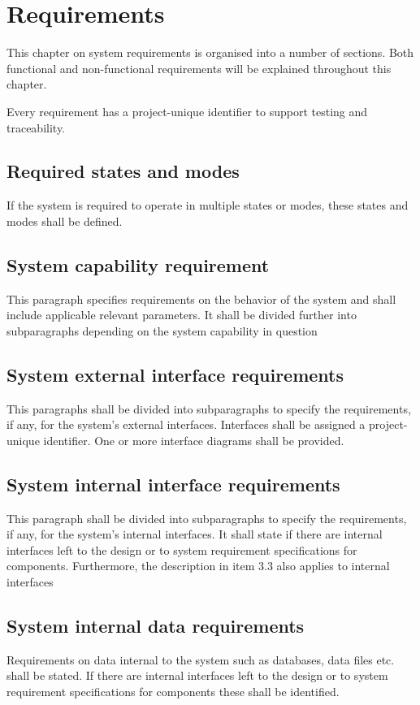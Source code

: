 \label{chp_requirements}
\chapter{Requirements}
This chapter on system requirements is organised into a number of sections. Both functional and non-functional requirements will be explained throughout this chapter.

Every requirement has a project-unique identifier to support testing and traceability.

\section{Required states and modes}
If the system is required to operate in multiple states or modes, these states and modes shall be defined.

\section{System capability requirement}
This paragraph specifies requirements on the behavior of the system and shall include applicable relevant parameters. It shall be divided further into subparagraphs depending on the system capability in question

\section{System external interface requirements}
This paragraphs shall be divided into subparagraphs to specify the requirements, if any, for the system’s external interfaces. Interfaces shall be assigned a project-unique identifier. One or more interface diagrams shall be provided.

\section{System internal interface requirements}
This paragraph shall be divided into subparagraphs to specify the requirements, if any, for the system’s internal interfaces. It shall state if there are internal interfaces left to the design or to system requirement specifications for components. Furthermore, the description in item 3.3 also applies to internal interfaces

\section{System internal data requirements}
Requirements on data internal to the system such as databases, data files etc. shall be stated. If there are internal interfaces left to the design or to system requirement specifications for components these shall be identified.


